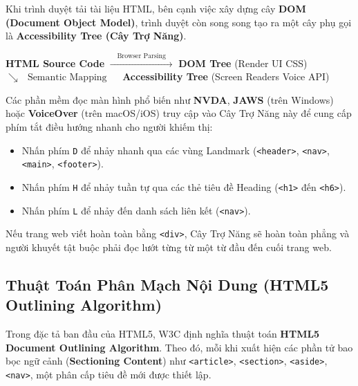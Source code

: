 \documentclass[11pt,oneside]{book}
\newcommand{\codeinline}[1]{\textcolor{accentOrange}{\texttt{#1}}}
\newcommand{\term}[1]{\textbf{\textcolor{primaryBlue}{#1}}}
\begin{document}
Khi trình duyệt tải tài liệu HTML, bên cạnh việc xây dựng cây \term{DOM (Document Object Model)}, trình duyệt còn song song tạo ra một cây phụ gọi là \term{Accessibility Tree (Cây Trợ Năng)}.

\begin{center}
\begin{tcolorbox}[
    enhanced, colback=codeBg!30!white, colframe=primaryBlue!25, arc=6pt, boxrule=0.8pt,
    top=10pt, bottom=10pt, left=12pt, right=12pt
]
\centering
\sffamily\small
\textbf{HTML Source Code} $\xrightarrow{\quad\text{Browser Parsing}\quad}$ \textbf{DOM Tree} (Render UI CSS) \\[4pt]
$\searrow\quad\text{Semantic Mapping}\quad$ \textbf{Accessibility Tree} (Screen Readers Voice API)
\end{tcolorbox}
\end{center}

Các phần mềm đọc màn hình phổ biến như \textbf{NVDA}, \textbf{JAWS} (trên Windows) hoặc \textbf{VoiceOver} (trên macOS/iOS) truy cập vào Cây Trợ Năng này để cung cấp phím tắt điều hướng nhanh cho người khiếm thị:
\begin{itemize}[leftmargin=1.8em, itemsep=3pt, parsep=0pt]
    \item Nhấn phím \codeinline{D} để nhảy nhanh qua các vùng Landmark (\codeinline{<header>}, \codeinline{<nav>}, \codeinline{<main>}, \codeinline{<footer>}).
    \item Nhấn phím \codeinline{H} để nhảy tuần tự qua các thẻ tiêu đề Heading (\codeinline{<h1>} đến \codeinline{<h6>}).
    \item Nhấn phím \codeinline{L} để nhảy đến danh sách liên kết (\codeinline{<nav>}).
\end{itemize}
Nếu trang web viết hoàn toàn bằng \codeinline{<div>}, Cây Trợ Năng sẽ hoàn toàn phẳng và người khuyết tật buộc phải đọc lướt từng từ một từ đầu đến cuối trang web.

\subsection{Thuật Toán Phân Mạch Nội Dung (HTML5 Outlining Algorithm)}

Trong đặc tả ban đầu của HTML5, W3C định nghĩa thuật toán \term{HTML5 Document Outlining Algorithm}. Theo đó, mỗi khi xuất hiện các phần tử bao bọc ngữ cảnh (\term{Sectioning Content}) như \codeinline{<article>}, \codeinline{<section>}, \codeinline{<aside>}, \codeinline{<nav>}, một phân cấp tiêu đề mới được thiết lập.
\end{document}
